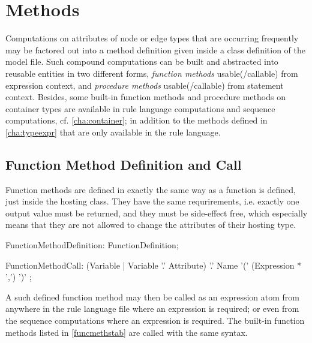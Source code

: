 \section{Methods}\label{sec:objectoriented}

Computations on attributes of node or edge types that are occurring frequently may be factored out into a method definition given inside a class definition of the model file.
Such compound computations can be built and abstracted into reusable entities in two different forms, \emph{function methods} usable(/callable) from expression context, and \emph{procedure methods} usable(/callable) from statement context.
Besides, some built-in function methods and procedure methods on container types are available in rule language computations and sequence computations, cf. \ref{cha:container};
in addition to the methods defined in \ref{cha:typeexpr} that are only available in the rule language.

\subsection{Function Method Definition and Call}\label{sub:functionmethods}\label{sec:funcmethcall} 

Function methods are defined in exactly the same way as a function is defined, just inside the hosting class.
They have the same requrirements, 
i.e. exactly one output value must be returned, 
and they must be side-effect free, which especially means that they are not allowed to change the attributes of their hosting type.

\begin{rail} 
  FunctionMethodDefinition: FunctionDefinition;
\end{rail}

\begin{rail}
  FunctionMethodCall: (Variable | Variable '.' Attribute) '.' Name '(' (Expression * ',') ')' ;
\end{rail}

A such defined function method may then be called as an expression atom from anywhere in the rule language file where an expression is required; or even from the sequence computations where an expression is required.
The built-in function methods listed in \ref{funcmethstab} are called with the same syntax.

